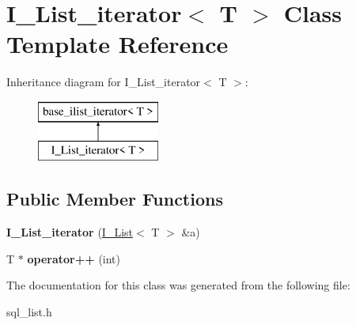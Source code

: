 \hypertarget{classI__List__iterator}{}\section{I\+\_\+\+List\+\_\+iterator$<$ T $>$ Class Template Reference}
\label{classI__List__iterator}
Inheritance diagram for I\+\_\+\+List\+\_\+iterator$<$ T $>$\+:\begin{figure}[H]
\begin{center}
\leavevmode
\includegraphics[height=2.000000cm]{classI__List__iterator}
\end{center}
\end{figure}
\subsection*{Public Member Functions}
\begin{DoxyCompactItemize}
\item 
\mbox{\label{classI__List__iterator_a10bce0d3effe7285613c4993715a3b24}} 
{\bfseries I\+\_\+\+List\+\_\+iterator} (\mbox{\hyperlink{classI__List}{I\+\_\+\+List}}$<$ T $>$ \&a)
\item 
\mbox{\label{classI__List__iterator_af59edd8bb9b56394a551db1277dc4836}} 
T $\ast$ {\bfseries operator++} (int)
\end{DoxyCompactItemize}


The documentation for this class was generated from the following file\+:\begin{DoxyCompactItemize}
\item 
sql\+\_\+list.\+h\end{DoxyCompactItemize}
